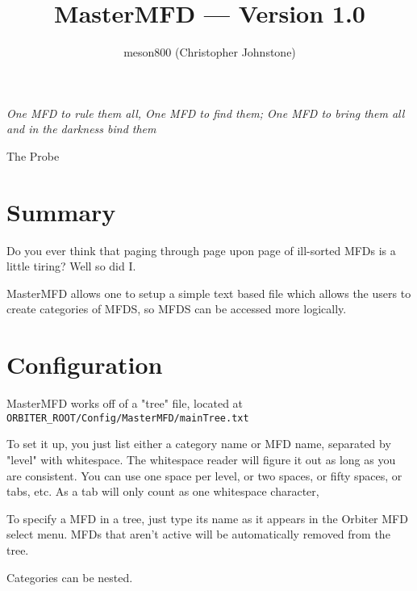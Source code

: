 \documentclass[12pt]{article}
\title{MasterMFD --- Version 1.0}
\author{meson800 (Christopher Johnstone)}
\begin{document}
\maketitle

\epigraph{\textit {One MFD to rule them all, One MFD to find them; One MFD to bring them all and in the darkness bind them}}{The Probe}

\newpage

\tableofcontents

\section{Summary}
Do you ever think that paging through page upon page of ill-sorted MFDs is a little tiring? Well so did I.

MasterMFD allows one to setup a simple text based file which allows the users to create categories of MFDS, so MFDS can be accessed more logically.

\section{Configuration}
MasterMFD works off of a "tree" file, located at \\ \texttt{ORBITER\_ROOT/Config/MasterMFD/mainTree.txt}

To set it up, you just list either a category name or MFD name, separated by "level" with whitespace. The whitespace reader will figure it out as long as you are consistent. You can use one space per level, or two spaces, or fifty spaces, or tabs, etc.
As a tab will only count as one whitespace character,{\color{red}{ mixing tabs and spaces in the tree file is not recommended.}}

To specify a MFD in a tree, just type its name as it appears in the Orbiter MFD select menu.  MFDs that aren't active will be automatically removed from the tree.

Categories can be nested.
\end{document}
